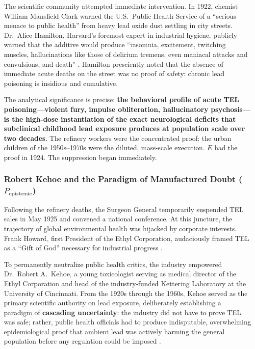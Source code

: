 \documentclass[12pt,openany]{book}
\begin{document}
The scientific community attempted immediate intervention. In 1922, chemist William Mansfield Clark warned the U.S.\ Public Health Service of a ``serious menace to public health'' from heavy lead oxide dust settling in city streets. Dr.\ Alice Hamilton, Harvard's foremost expert in industrial hygiene, publicly warned that the additive would produce ``insomnia, excitement, twitching muscles, hallucinations like those of delirium tremens, even maniacal attacks and convulsions, and death'' \cite{tel_hamilton}. Hamilton presciently noted that the absence of immediate acute deaths on the street was no proof of safety: chronic lead poisoning is insidious and cumulative.

The analytical significance is precise: \textbf{the behavioral profile of acute TEL poisoning---violent fury, impulse obliteration, hallucinatory psychosis---is the high-dose instantiation of the exact neurological deficits that subclinical childhood lead exposure produces at population scale over two decades}. The refinery workers were the concentrated proof; the urban children of the 1950s--1970s were the diluted, mass-scale execution. $E$ had the proof in 1924. The suppression began immediately.

\subsubsection{Robert Kehoe and the Paradigm of Manufactured Doubt (\texorpdfstring{$P_{\text{epistemic}}$}{P\_epistemic})}

Following the refinery deaths, the Surgeon General temporarily suspended TEL sales in May 1925 and convened a national conference. At this juncture, the trajectory of global environmental health was hijacked by corporate interests. Frank Howard, first President of the Ethyl Corporation, audaciously framed TEL as a ``Gift of God'' necessary for industrial progress \cite{tel_kehoe}.

To permanently neutralize public health critics, the industry empowered Dr.\ Robert A.\ Kehoe, a young toxicologist serving as medical director of the Ethyl Corporation and head of the industry-funded Kettering Laboratory at the University of Cincinnati. From the 1920s through the 1960s, Kehoe served as the primary scientific authority on lead exposure, deliberately establishing a paradigm of \textbf{cascading uncertainty}: the industry did not have to prove TEL was safe; rather, public health officials had to produce indisputable, overwhelming epidemiological proof that ambient lead was actively harming the general population before any regulation could be imposed \cite{tel_kehoe, tel_secret_history}.
\end{document}
